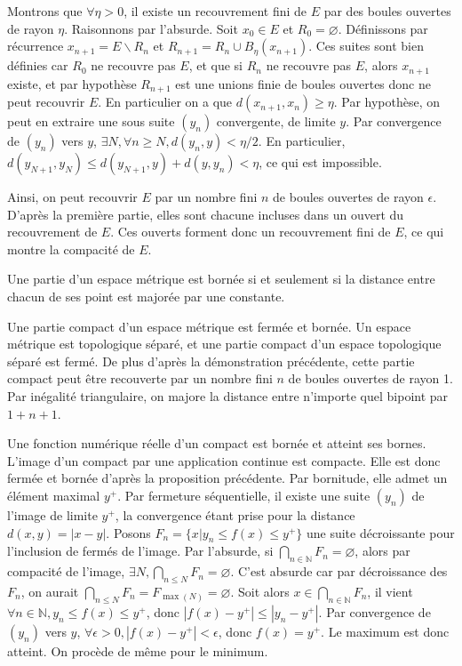 \documentclass[a4paper, 11pt, french]{book}
\theoremstyle{plain} %
\theoremstyle{definition} %
\theoremstyle{remark} %
\renewcommand{\setminus}{\backslash}
\newcommand{\1}{\mathds{1}}
\newcommand\vide{\varnothing}
\newcommand{\infegal}{\leqslant}
\newcommand{\supegal}{\geqslant}
\newcommand{\N}{\mathbb{N}}
\begin{document}
Montrons que $\forall\eta>0$, il existe un recouvrement fini de $E$ par des boules ouvertes de rayon $\eta$.
Raisonnons par l'absurde.
Soit $x_0\in E$ et $R_0=\vide$.
Définissons par récurrence $x_{n+1}=E\setminus R_n$ et $R_{n+1}=R_n\cup B_\eta(x_{n+1})$.
Ces suites sont bien définies car $R_0$ ne recouvre pas $E$, et que si $R_n$ ne recouvre pas $E$, alors $x_{n+1}$ existe, et par hypothèse $R_{n+1}$ est une unions finie de boules ouvertes donc ne peut recouvrir $E$.
En particulier on a que $d(x_{n+1}, x_n)\supegal\eta$.
Par hypothèse, on peut en extraire une sous suite $(y_n)$ convergente, de limite $y$.
Par convergence de $(y_n)$ vers $y$, $\exists N, \forall n\supegal N, d(y_n, y)<\eta/2$.
En particulier, $d(y_{N+1}, y_N)\infegal d(y_{N+1}, y)+d(y, y_n)<\eta$, ce qui est impossible.

Ainsi, on peut recouvrir $E$ par un nombre fini $n$ de boules ouvertes de rayon $\epsilon$.
D'après la première partie, elles sont chacune incluses dans un ouvert du recouvrement de $E$.
Ces ouverts forment donc un recouvrement fini de $E$, ce qui montre la compacité de $E$.

Une partie d'un espace métrique est bornée si et seulement si la distance entre chacun de ses point est majorée par une constante.

\proposition
Une partie compact d'un espace métrique est fermée et bornée.
\demonstration
Un espace métrique est topologique séparé, et une partie compact d'un espace topologique séparé est fermé.
De plus d'après la démonstration précédente, cette partie compact peut être recouverte par un nombre fini $n$ de boules ouvertes de rayon 1.
Par inégalité triangulaire, on majore la distance entre n'importe quel bipoint par $1+n+1$.

\proposition
Une fonction numérique réelle d'un compact est bornée et atteint ses bornes.
\demonstration
L’image d'un compact par une application continue est compacte.
Elle est donc fermée et bornée d'après la proposition précédente.
Par bornitude, elle admet un élément maximal $y^+$.
Par fermeture séquentielle, il existe une suite $(y_n)$ de l'image de limite $y^+$, la convergence étant prise pour la distance $d(x, y)=|x-y|$.
Posons $F_n=\{x|y_n\infegal f(x)\infegal y^+\}$ une suite décroissante pour l'inclusion de fermés de l'image.
Par l'absurde, si $\bigcap_{n\in\N}F_n=\vide$, alors par compacité de l'image, $\exists N, \bigcap_{n\infegal N}F_n=\vide$.
C'est absurde car par décroissance des $F_n$, on aurait $\bigcap_{n\infegal N}F_n=F_{\max(N)}=\vide$.
Soit alors $x\in\bigcap_{n\in\N}F_n$, il vient $\forall n\in\N, y_n\infegal f(x)\infegal y^+$, donc $|f(x)-y^+| \infegal |y_n-y^+|$.
Par convergence de $(y_n)$ vers $y$, $\forall\epsilon>0, |f(x)-y^+|<\epsilon$, donc $f(x)=y^+$.
Le maximum est donc atteint.
On procède de même pour le minimum.
\end{document}

